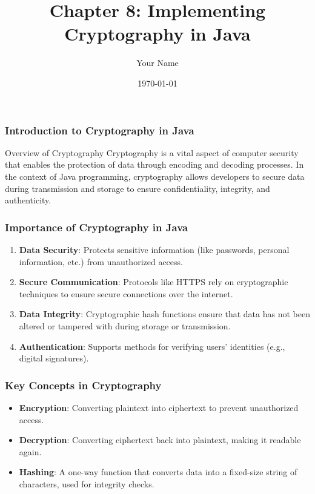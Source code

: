 \documentclass{beamer}
\title{Chapter 8: Implementing Cryptography in Java}
\author{Your Name}
\institute{Your Institution}
\date{\today}
\begin{document}
\frame{\titlepage}

\begin{frame}[fragile]
    \frametitle{Introduction to Cryptography in Java}
    \begin{block}{Overview of Cryptography}
        Cryptography is a vital aspect of computer security that enables the protection of data through encoding and decoding processes. 
        In the context of Java programming, cryptography allows developers to secure data during transmission and storage to ensure confidentiality, integrity, and authenticity.
    \end{block}
\end{frame}

\begin{frame}[fragile]
    \frametitle{Importance of Cryptography in Java}
    \begin{enumerate}
        \item \textbf{Data Security}: Protects sensitive information (like passwords, personal information, etc.) from unauthorized access.
        \item \textbf{Secure Communication}: Protocols like HTTPS rely on cryptographic techniques to ensure secure connections over the internet.
        \item \textbf{Data Integrity}: Cryptographic hash functions ensure that data has not been altered or tampered with during storage or transmission.
        \item \textbf{Authentication}: Supports methods for verifying users' identities (e.g., digital signatures).
    \end{enumerate}
\end{frame}

\begin{frame}[fragile]
    \frametitle{Key Concepts in Cryptography}
    \begin{itemize}
        \item \textbf{Encryption}: Converting plaintext into ciphertext to prevent unauthorized access.
        \item \textbf{Decryption}: Converting ciphertext back into plaintext, making it readable again.
        \item \textbf{Hashing}: A one-way function that converts data into a fixed-size string of characters, used for integrity checks.
    \end{itemize}
\end{frame}
\end{document}
